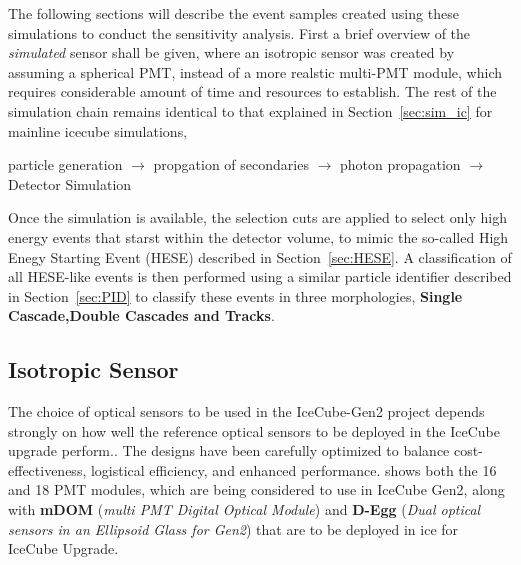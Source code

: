 The following sections will describe the event samples created using these simulations to conduct the sensitivity analysis. First a brief overview of the \emph{simulated} sensor shall be given, where an isotropic sensor was created by assuming a spherical PMT, instead of a more realstic multi-PMT module, which requires considerable amount of time and resources to establish. The rest of the simulation chain remains identical to that explained in Section~\ref{sec:sim_ic} for mainline icecube simulations,
\begin{kaobox}
    particle generation $\rightarrow$ propgation of secondaries $\rightarrow$ photon propagation $\rightarrow$ Detector Simulation 
\end{kaobox}
Once the simulation is available, the selection cuts are applied to select only high energy events that starst within the detector volume, to mimic the so-called High Enegy Starting Event (HESE) described in Section~\ref{sec:HESE}. A classification of all HESE-like events is then performed using a similar particle identifier described in Section~\ref{sec:PID} to classify these events in three morphologies, \textbf{Single Cascade,Double Cascades and Tracks}. 
\subsection{Isotropic Sensor}
\label{sec:isopdom}
The choice of optical sensors to be used in the IceCube-Gen2 project depends strongly on how well the reference optical sensors to be deployed in the IceCube upgrade perform.. The designs have been carefully optimized to balance cost-effectiveness, logistical efficiency, and enhanced performance.  shows both the 16 and 18 PMT modules, which are being considered to use in IceCube Gen2, along with \textbf{mDOM} (\emph{multi PMT Digital Optical Module})  and \textbf{D-Egg} (\emph{Dual optical sensors in an Ellipsoid Glass for Gen2})  that are to be deployed in ice for IceCube Upgrade.


